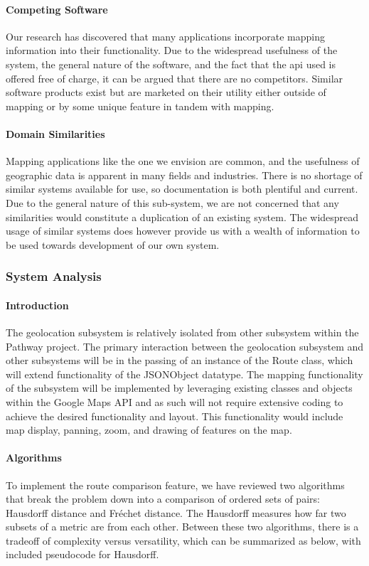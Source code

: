 ﻿\documentclass{article}
\begin{document}
\paragraph{Competing Software}
Our research has discovered that many applications incorporate mapping information into their functionality. Due to the widespread usefulness of the system, the general nature of the software, and the fact that the api used is offered free of charge, it can be argued that there are no competitors. Similar software products exist but are marketed on their utility either outside of mapping or by some unique feature in tandem with mapping.

\paragraph{Domain Similarities}
Mapping applications like the one we envision are common, and the usefulness of geographic data is apparent in many fields and industries. There is no shortage of similar systems available for use, so documentation is both plentiful and current. Due to the general nature of this sub-system, we are not concerned that any similarities would constitute a duplication of an existing system. The widespread usage of similar systems does however provide us with a wealth of information to be used towards development of our own system.

\subsubsection{System Analysis}
\paragraph{Introduction}
The geolocation subsystem is relatively isolated from other subsystem within the Pathway project. The primary interaction between the geolocation
subsystem and other subsystems will be in the passing of an instance of the Route class, which will extend functionality of the JSONObject datatype. The mapping functionality of the subsystem will be implemented by leveraging existing classes and objects within
the Google Maps API and as such will not require extensive coding to achieve the desired functionality and layout.
This functionality would include map display, panning, zoom, and drawing of features on the map.


\paragraph{Algorithms}
To implement the route comparison feature, we have reviewed two algorithms that break the problem down into a comparison of ordered sets of pairs:
Hausdorff distance and Fréchet distance. 
The Hausdorff measures how far two subsets of a metric are from each other. \cite{g_hausdorff}Between these two algorithms, there is a tradeoff of complexity versus versatility,
which can be summarized as below, with included pseudocode for Hausdorff.
\end{document}
